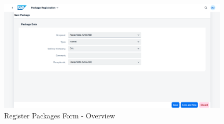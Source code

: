 \begin{figure}[H]
	\centering
	\includegraphics[width=1\linewidth]{images/user_doc/registration/overview.png}
	\caption{Register Packages Form - Overview}
	\label{fig:RPOverview}
\end{figure}


